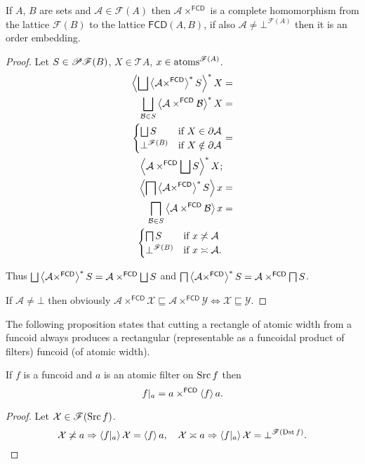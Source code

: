 \begin{thm}
If $A$, $B$ are sets and $\mathcal{A}\in\mathscr{F}(A)$ then
$\mathcal{A}\times^{\mathsf{FCD}}$
is a complete homomorphism from the lattice $\mathscr{F}(B)$ to the
lattice $\mathsf{FCD}(A,B)$, if also $\mathcal{A}\ne\bot^{\mathscr{F}(A)}$
then it is an order embedding.\end{thm}
\begin{proof}
Let $S\in\mathscr{P}\mathscr{F}(B)$, $X\in\mathscr{T}A$,
$x\in\operatorname{atoms}^{\mathscr{F}(A)}$.
\begin{align*}
\rsupfun{\bigsqcup\rsupfun{\mathcal{A}\times^{\mathsf{FCD}}}S}X & =\\
\bigsqcup_{\mathcal{B}\in
S}\rsupfun{\mathcal{A}\times^{\mathsf{FCD}}\mathcal{B}}X & =\\
\begin{cases}
\bigsqcup S & \text{if }X\in\corestar\mathcal{A}\\
\bot^{\mathscr{F}(B)} & \text{if }X\notin\corestar\mathcal{A}
\end{cases} & =\\
\rsupfun{\mathcal{A}\times^{\mathsf{FCD}}\bigsqcup S}X;\\
\supfun{\bigsqcap\rsupfun{\mathcal{A}\times^{\mathsf{FCD}}}S}x & =\\
\bigsqcap_{\mathcal{B}\in
S}\supfun{\mathcal{A}\times^{\mathsf{FCD}}\mathcal{B}}x & =\\
\begin{cases}
\bigsqcap S & \text{if }x\nasymp\mathcal{A}\\
\bot^{\mathscr{F}(B)} & \text{if }x\asymp\mathcal{A}.
\end{cases}
\end{align*}


Thus
$\bigsqcup\rsupfun{\mathcal{A}\times^{\mathsf{FCD}}}S=\mathcal{A}\times^{\mathsf
{FCD}}\bigsqcup S$
and
$\bigsqcap\left\langle \mathcal{A}\times^{\mathsf{FCD}}\right\rangle ^{\ast}S=\mathcal{A}\times^{\mathsf
{FCD}}\bigsqcap S$.

If $\mathcal{A}\ne\bot$ then obviously
$\mathcal{A}\times^{\mathsf{FCD}}\mathcal{X}\sqsubseteq\mathcal{A}\times^{\mathsf{FCD}}\mathcal{Y} \Leftrightarrow
\mathcal{X}\sqsubseteq\mathcal{Y}$.
\end{proof}
The following proposition states that cutting a rectangle of atomic
width from a funcoid always produces a rectangular (representable
as a funcoidal product of filters) funcoid (of atomic width).
\begin{prop}
If $f$ is a funcoid and $a$ is an atomic filter on $\operatorname{Src} f$ then
\[
f|_{a}=a\times^{\mathsf{FCD}}\left\langle f\right\rangle a.
\]
\end{prop}
\begin{proof}
Let $\mathcal{X}\in\mathscr{F}(\operatorname{Src} f)$.
\[
\mathcal{X}\not\asymp a\Rightarrow\left\langle f|_{a}\right\rangle\mathcal{X}=\left\langle f\right\rangle a,\quad\mathcal{X}\asymp
a\Rightarrow\left\langle f|_{a}\right\rangle\mathcal{X}=\bot^{\mathscr{F}(\operatorname{Dst} f)}.
\]

\end{proof}

